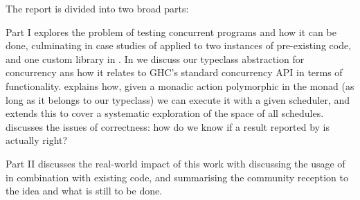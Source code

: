 The report is divided into two broad parts:

Part I explores the problem of testing concurrent programs and how it
can be done, culminating in case studies of \dejafu{} applied to two
instances of pre-existing code, and one custom library in
. In  we discuss our typeclass
abstraction for concurrency ans how it relates to GHC's standard
concurrency API in terms of functionality.  explains
how, given a monadic action polymorphic in the monad (as long as it
belongs to our typeclass) we can execute it with a given scheduler,
and  extends this to cover a systematic exploration of the
space of all schedules.  discusses the issues of
correctness: how do we know if a result reported by \dejafu{} is
actually right?

Part II discusses the real-world impact of this work with
 discussing the usage of \dejafu{} in combination with
existing code, and  summarising the community
reception to the idea and what is still to be done.
